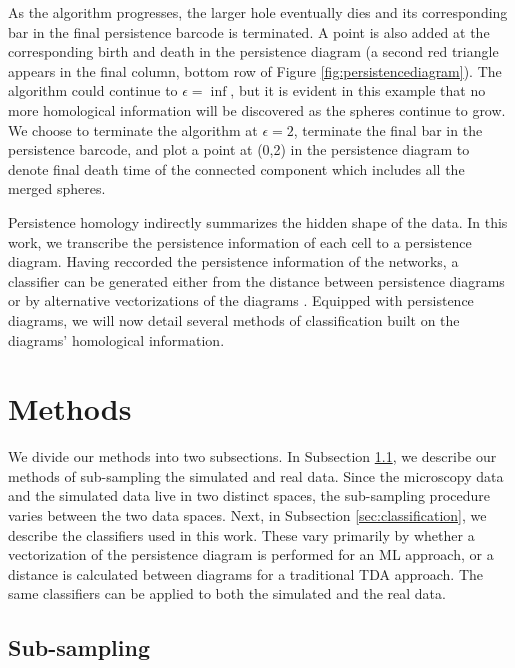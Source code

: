 \documentclass[10pt]{article}
\begin{document}
As the algorithm progresses, the larger hole eventually dies and its corresponding bar in the final persistence barcode is terminated. A point is also added at the corresponding birth and death in the persistence diagram (a second red triangle appears in the final column, bottom row of Figure \ref{fig:persistencediagram}). The algorithm could continue to $\epsilon=\inf$, but it is evident in this example that no more homological information will be discovered as the spheres continue to grow. We choose to terminate the algorithm at $\epsilon=2$, terminate the final bar in the persistence barcode, and plot a point at (0,2) in the persistence diagram to denote final death time of the connected component which includes all the merged spheres.

Persistence homology indirectly summarizes the hidden shape of the data. In this work, we transcribe the persistence information of each cell to a persistence diagram. Having reccorded the persistence information of the networks, a classifier can be generated either from the distance \cite{marchese2018signal} between persistence diagrams or by alternative vectorizations of the diagrams \cite{adams2017persistence,bubenik2015statistical,maroulas2018stable}. Equipped with persistence diagrams, we will now detail several methods of classification built on the diagrams' homological information.

\section{Methods}\label{sec:methods}
We divide our methods into two subsections. In Subsection \ref{sec:Sub-sampling}, we describe our methods of sub-sampling the simulated and real data. Since the microscopy data and the simulated data live in two distinct spaces, the sub-sampling procedure varies between the two data spaces. Next, in Subsection \ref{sec:classification}, we describe the classifiers used in this work. These vary primarily by whether a vectorization of the persistence diagram is performed for an ML approach, or a distance is calculated between diagrams for a traditional TDA approach. The same classifiers can be applied to both the simulated and the real data.

\subsection{Sub-sampling}\label{sec:Sub-sampling}
\end{document}
